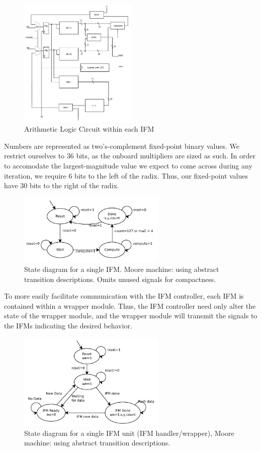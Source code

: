 \documentclass{article}
\begin{document}
\begin{figure}[H]
  \centering
    \includegraphics[width=160pt]{block_diagrams/ifm.pdf}
  \caption{Arithmetic Logic Circuit within each IFM}
\end{figure}

Numbers are represented as two's-complement fixed-point binary
values. We restrict ourselves to 36 bits, as the onboard multipliers
are sized as such. In order to accomodate the largest-magnitude value we
expect to come across during any iteration, we require 6 bits to the
left of the radix. Thus, our fixed-point values have 30 bits to the
right of the radix.

\begin{figure}[H]
  \centering
    \includegraphics[width=200pt]{state_diagrams/ifm.pdf}
  \caption{State diagram for a single IFM. Moore
    machine: using abstract transition descriptions. Omits unused
    signals for compactness.}
\end{figure}


To more easily facilitate communication with the IFM controller, each IFM is contained within a wrapper module.
Thus, the IFM controller need only alter the state of the wrapper module, and the wrapper module will transmit 
the signals to the IFMs indicating the desired behavior.

\begin{figure}[H]
  \centering
    \includegraphics[width=200pt]{state_diagrams/ifmunit.pdf}
  \caption{State diagram for a single IFM unit (IFM handler/wrapper),
    Moore machine: using abstract transition descriptions.}
\end{figure}
\end{document}

